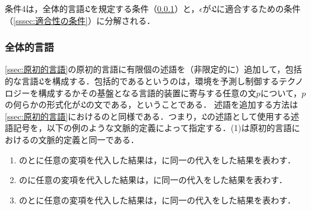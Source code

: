 条件4は，全体的言語$\mathfrak{L}$を規定する条件（\ref{sssec:全体的言語}）と，$\epsilon$が$\mathfrak{L}$に適合するための条件（\ref{sssec:適合性の条件}）に分解される．

\subsubsection{全体的言語}
\label{sssec:全体的言語}

\ref{ssec:原初的言語}の原初的言語に有限個の述語を（非限定的に）追加して，包括的な言語$\mathfrak{L}$を構成する．包括的であるというのは，環境を予測し制御するテクノロジーを構成するかその基盤となる言語的装置に寄与する任意の文$p$について，$p$の何らかの形式化が$\mathfrak{L}$の文である，ということである．
述語を追加する方法は\ref{ssec:原初的言語}におけるのと同様である．つまり，$\mathfrak{L}$の述語として使用する述語記号を，以下の例のような文脈的定義によって指定する．(1)は原初的言語における\kagi{$ \in $}の文脈的定義と同一である．
\begin{enumerate}[label=(\arabic*)]
    \item \kagi{$\alpha\in\beta$}の\kagi{$\alpha$}と\kagi{$\beta$}に任意の変項を代入した結果は，に同一の代入をした結果を表わす．
    \item {}の\kagi{$\alpha$}に任意の変項を代入した結果は，に同一の代入をした結果を表わす．
    \item {}の\kagi{$\alpha$}と\kagi{$\beta$}に任意の変項を代入した結果は，に同一の代入をした結果を表わす．
\end{enumerate}

